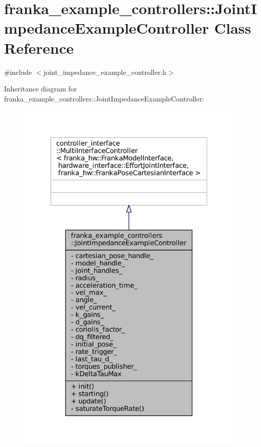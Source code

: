 \hypertarget{classfranka__example__controllers_1_1JointImpedanceExampleController}{}\section{franka\+\_\+example\+\_\+controllers\+:\+:Joint\+Impedance\+Example\+Controller Class Reference}
\label{classfranka__example__controllers_1_1JointImpedanceExampleController}


{\ttfamily \#include $<$joint\+\_\+impedance\+\_\+example\+\_\+controller.\+h$>$}



Inheritance diagram for franka\+\_\+example\+\_\+controllers\+:\+:Joint\+Impedance\+Example\+Controller\+:
\nopagebreak
\begin{figure}[H]
\begin{center}
\leavevmode
\includegraphics[width=313pt]{classfranka__example__controllers_1_1JointImpedanceExampleController__inherit__graph}
\end{center}
\end{figure}


